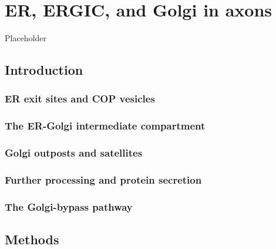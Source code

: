 \documentclass[
  12pt,
  a4paper,
]{book}
\begin{document}
\hypertarget{er-ergic-and-golgi-in-axons}{%
\chapter{ER, ERGIC, and Golgi in axons}\label{er-ergic-and-golgi-in-axons}}

Placeholder

\hypertarget{introduction-2}{%
\section{Introduction}\label{introduction-2}}

\hypertarget{er-exit-sites-and-cop-vesicles}{%
\subsection{ER exit sites and COP vesicles}\label{er-exit-sites-and-cop-vesicles}}

\hypertarget{the-er-golgi-intermediate-compartment}{%
\subsection{The ER-Golgi intermediate compartment}\label{the-er-golgi-intermediate-compartment}}

\hypertarget{golgi-outposts-and-satellites}{%
\subsection{Golgi outposts and satellites}\label{golgi-outposts-and-satellites}}

\hypertarget{further-processing-and-protein-secretion}{%
\subsection{Further processing and protein secretion}\label{further-processing-and-protein-secretion}}

\hypertarget{the-golgi-bypass-pathway}{%
\subsection{The Golgi-bypass pathway}\label{the-golgi-bypass-pathway}}

\hypertarget{methods-2}{%
\section{Methods}\label{methods-2}}
\end{document}
